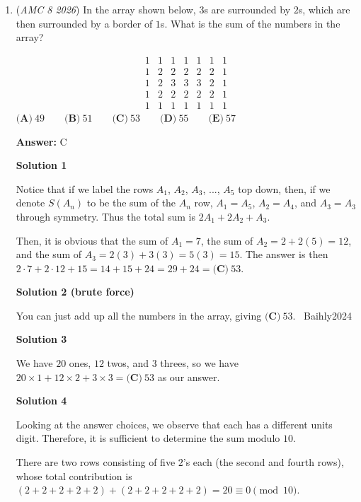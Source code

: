 \begin{enumerate}
	\item (\textit{AMC 8 2026}) In the array shown below, $3$s are surrounded by  $2$s, which are then surrounded by a border of $1$s. What is the sum of the numbers in the array?


 
 \[\begin{array}{ccccccc} 1 & 1 & 1 & 1 & 1 & 1 & 1 \\ 1 & 2 & 2 & 2 & 2 & 2 & 1 \\ 1 & 2 & 3 & 3 & 3 & 2 & 1 \\ 1 & 2 & 2 & 2 & 2 & 2 & 1 \\ 1 & 1 & 1 & 1 & 1 & 1 & 1 \end{array}\]
$\textbf{(A)}\ 49 \qquad \textbf{(B)}\ 51 \qquad \textbf{(C)}\ 53 \qquad \textbf{(D)}\ 55 \qquad \textbf{(E)}\ 57$

 \textbf{Answer: }C



\textbf{Solution 1}

Notice that if we label the rows $A_1$, $A_2$, $A_3$, ..., $A_5$ top down, then, if we denote $S(A_n)$ to be the sum of the $A_n$ row, $A_1 = A_5$, $A_2 = A_4$, and $A_3 = A_3$ through symmetry. Thus the total sum is $2A_1 + 2A_2 + A_3$.

 Then, it is obvious that the sum of $A_1 = 7$, the sum of $A_2 = 2 + 2(5) = 12$, and the sum of $A_3 = 2(3) + 3(3) = 5(3) = 15$. The answer is then $2 \cdot 7 + 2 \cdot 12 + 15 = 14 + 15 + 24 = 29 + 24 = \boxed{\textbf{(C)}\  53}$.

 



\textbf{Solution 2 (brute force)}

You can just add up all the numbers in the array, giving $\boxed{\textbf{(C)}\ 53}$. ~Baihly2024

 



\textbf{Solution 3}

We have $20$ ones, $12$ twos, and $3$ threes, so we have $20\times1+12\times2+3\times3=\boxed{\textbf{(C)}\ 53}$ as our answer.

 



\textbf{Solution 4}

Looking at the answer choices, we observe that each has a different units digit. Therefore, it is sufficient to determine the sum modulo $10$.

 There are two rows consisting of five $2$’s each (the second and fourth rows), whose total contribution is$(2+2+2+2+2)+(2+2+2+2+2)=20\equiv 0 \pmod{10}$.


\end{enumerate}
